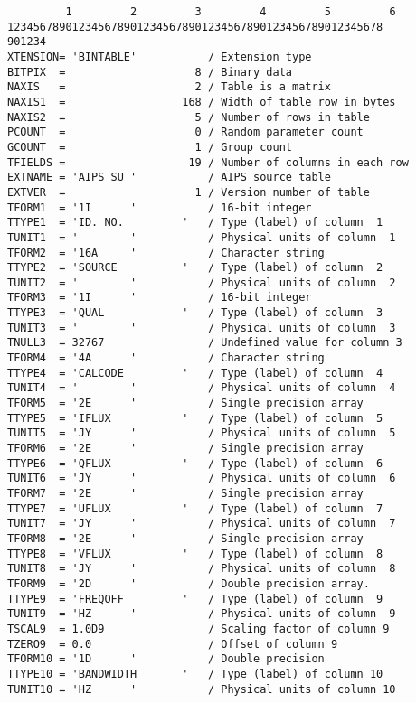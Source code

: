 {\small \begin{verbatim}
         1         2         3         4         5         6
1234567890123456789012345678901234567890123456789012345678
901234
XTENSION= 'BINTABLE'           / Extension type
BITPIX  =                    8 / Binary data
NAXIS   =                    2 / Table is a matrix
NAXIS1  =                  168 / Width of table row in bytes
NAXIS2  =                    5 / Number of rows in table
PCOUNT  =                    0 / Random parameter count
GCOUNT  =                    1 / Group count
TFIELDS =                   19 / Number of columns in each row
EXTNAME = 'AIPS SU '           / AIPS source table
EXTVER  =                    1 / Version number of table 
TFORM1  = '1I      '           / 16-bit integer
TTYPE1  = 'ID. NO.         '   / Type (label) of column  1
TUNIT1  = '        '           / Physical units of column  1
TFORM2  = '16A     '           / Character string
TTYPE2  = 'SOURCE          '   / Type (label) of column  2
TUNIT2  = '        '           / Physical units of column  2
TFORM3  = '1I      '           / 16-bit integer
TTYPE3  = 'QUAL            '   / Type (label) of column  3
TUNIT3  = '        '           / Physical units of column  3
TNULL3  = 32767                / Undefined value for column 3
TFORM4  = '4A      '           / Character string
TTYPE4  = 'CALCODE         '   / Type (label) of column  4
TUNIT4  = '        '           / Physical units of column  4
TFORM5  = '2E      '           / Single precision array
TTYPE5  = 'IFLUX           '   / Type (label) of column  5
TUNIT5  = 'JY      '           / Physical units of column  5
TFORM6  = '2E      '           / Single precision array
TTYPE6  = 'QFLUX           '   / Type (label) of column  6
TUNIT6  = 'JY      '           / Physical units of column  6
TFORM7  = '2E      '           / Single precision array
TTYPE7  = 'UFLUX           '   / Type (label) of column  7
TUNIT7  = 'JY      '           / Physical units of column  7
TFORM8  = '2E      '           / Single precision array
TTYPE8  = 'VFLUX           '   / Type (label) of column  8
TUNIT8  = 'JY      '           / Physical units of column  8
TFORM9  = '2D      '           / Double precision array.
TTYPE9  = 'FREQOFF         '   / Type (label) of column  9
TUNIT9  = 'HZ      '           / Physical units of column  9
TSCAL9  = 1.0D9                / Scaling factor of column 9
TZERO9  = 0.0                  / Offset of column 9
TFORM10 = '1D      '           / Double precision
TTYPE10 = 'BANDWIDTH       '   / Type (label) of column 10
TUNIT10 = 'HZ      '           / Physical units of column 10

\end{verbatim}}

